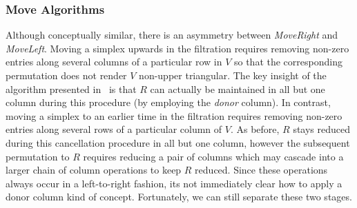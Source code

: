 \documentclass[sn-mathphys]{sn-jnl}
\begin{document}
\subsubsection*{Move Algorithms}
Although conceptually similar, there is an asymmetry between \emph{MoveRight} and \emph{MoveLeft}. Moving a simplex upwards in the filtration requires removing non-zero entries along several columns of a particular row in $V$ so that the corresponding permutation does not render $V$ non-upper triangular. The key insight of the algorithm presented in~\cite{busaryev2010tracking} is that $R$ can actually be maintained in all but one column during this procedure (by employing the \emph{donor} column). In contrast, moving a simplex to an earlier time in the filtration requires removing non-zero entries along several rows of a particular column of $V$. As before, $R$ stays reduced during this cancellation procedure in all but one column, however the subsequent permutation to $R$ requires reducing a pair of columns which may cascade into a larger chain of column operations to keep $R$ reduced. Since these operations always occur in a left-to-right fashion, its not immediately clear how to apply a donor column kind of concept. Fortunately, we can still separate  these two stages. 
\end{document}
